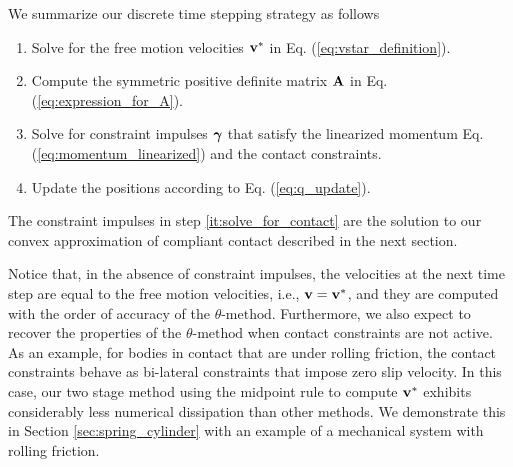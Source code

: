 We summarize our discrete time stepping strategy as follows
\begin{enumerate}
	\item Solve for the free motion velocities ${\mathbf{v}}^*$ in Eq.
	(\ref{eq:vstar_definition}).
	\item Compute the symmetric positive definite matrix ${\mathbf{A}}$ in Eq.
	(\ref{eq:expression_for_A}).
	\item\label{it:solve_for_contact} Solve for constraint impulses ${\bm\gamma}$
	that satisfy the linearized momentum Eq. (\ref{eq:momentum_linearized}) and
	the contact constraints. 
	\item Update the positions according to Eq. (\ref{eq:q_update}).
\end{enumerate}

The constraint impulses in step \ref{it:solve_for_contact} are the solution to
our convex approximation of compliant contact described in the next section.

Notice that, in the absence of constraint impulses, the velocities at the next
time step are equal to the free motion velocities, i.e., ${\mathbf{v}}={\mathbf{v}}^*$, and
they are computed with the order of accuracy of the $\theta\text{-method}$.
Furthermore, we also expect to recover the properties of the
$\theta\text{-method}$ when contact constraints are not active. As an example,
for bodies in contact that are under rolling friction,
the contact constraints behave as bi-lateral constraints that impose zero slip
velocity. In this case, our two stage method using the midpoint rule to compute
${\mathbf{v}}^*$ exhibits considerably less numerical dissipation than other methods.
We demonstrate this in Section \ref{sec:spring_cylinder} with an example of a
mechanical system with rolling friction.


